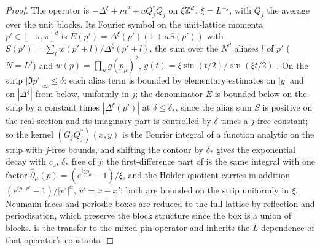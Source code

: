 \begin{proof}
The operator is $-\Delta^\xi+m^2+aQ_j^*Q_j$ on $\xi\mathbb Z^d$, $\xi=L^{-j}$, with $Q_j$ the average over the unit blocks. Its Fourier symbol on the unit-lattice momenta $p'\in[-\pi,\pi]^d$ is $E(p')=\Delta^\xi(p')(1+aS(p'))$ with $S(p')=\sum_{l}w(p'+l)/\Delta^\xi(p'+l)$, the sum over the $N^d$ aliases $l$ of $p'$ ($N=L^j$) and $w(p)=\prod_\mu g(p_\mu)^2$, $g(t)=\xi\sin(t/2)/\sin(\xi t/2)$ \cite[(2.44)--(2.48)]{Ba4}. On the strip $|\Im p'|_\infty\le\delta$: each alias term is bounded by elementary estimates on $|g|$ and on $|\Delta^\xi|$ from below, uniformly in $j$; the denominator $E$ is bounded below on the strip by a constant times $|\Delta^\xi(p')|$ at $\delta\le\delta_*$, since the alias sum $S$ is positive on the real section and its imaginary part is controlled by $\delta$ times a $j$-free constant; so the kernel $(G_jQ_j^*)(x,y)$ is the Fourier integral of a function analytic on the strip with $j$-free bounds, and shifting the contour by $\delta_*$ gives the exponential decay \cite[(2.35)]{Ba4} with $c_0$, $\delta_*$ free of $j$; the first-difference part of \cite[(2.35)]{Ba4} is the same integral with one factor $\hat\partial_\mu(p)=(e^{i\xi p_\mu}-1)/\xi$, and the H\"older quotient \cite[(2.36)]{Ba4} carries in addition $(e^{ip\cdot v'}-1)/|v'|^{\alpha}$, $v'=x-x'$; both are bounded on the strip uniformly in $\xi$. Neumann faces and periodic boxes are reduced to the full lattice by reflection and periodisation, which preserve the block structure since the box is a union of blocks. \cite[(2.37)]{Ba4} is the transfer to the mixed-pin operator and inherits the $L$-dependence of that operator's constants.
\end{proof}

